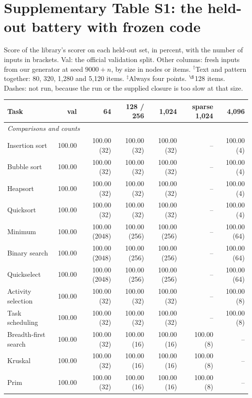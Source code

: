 \documentclass[10pt]{article}
\begin{document}
\section*{Supplementary Table S1: the held-out battery with frozen code}

{\small Score of the library's scorer on each held-out set, in percent, with the number of inputs in brackets. Val: the
official validation split. Other columns: fresh inputs from our generator at seed $9000+n$, by size in nodes or items.
$^\dagger$Text and pattern together: 80, 320, 1,280 and 5,120 items. $^\ddagger$Always four points.
$^\S$128 items. Dashes: not run, because the run or the supplied closure is too slow at that size.\par}
\begin{center}\scriptsize
\begin{tabular}{lrrrrrr}\toprule
Task & val & 64 & 128 / 256 & 1,024 & sparse 1,024 & 4,096 \\\midrule
\multicolumn{7}{l}{\textit{Comparisons and counts}} \\
Insertion sort & 100.00 & 100.00 (32) & 100.00 (32) & 100.00 (32) & -- & 100.00 (4) \\
Bubble sort & 100.00 & 100.00 (32) & 100.00 (32) & 100.00 (32) & -- & 100.00 (4) \\
Heapsort & 100.00 & 100.00 (32) & 100.00 (32) & 100.00 (32) & -- & 100.00 (4) \\
Quicksort & 100.00 & 100.00 (32) & 100.00 (32) & 100.00 (32) & -- & 100.00 (4) \\
Minimum & 100.00 & 100.00 (2048) & 100.00 (256) & 100.00 (256) & -- & 100.00 (64) \\
Binary search & 100.00 & 100.00 (2048) & 100.00 (256) & 100.00 (256) & -- & 100.00 (64) \\
Quickselect & 100.00 & 100.00 (2048) & 100.00 (256) & 100.00 (256) & -- & 100.00 (64) \\
Activity selection & 100.00 & 100.00 (32) & 100.00 (32) & 100.00 (32) & -- & 100.00 (8) \\
Task scheduling & 100.00 & 100.00 (32) & 100.00 (32) & 100.00 (32) & -- & 100.00 (8) \\
Breadth-first search & 100.00 & 100.00 (32) & 100.00 (16) & 100.00 (16) & 100.00 (8) & -- \\
Kruskal & 100.00 & 100.00 (32) & 100.00 (16) & 100.00 (16) & 100.00 (8) & -- \\
Prim & 100.00 & 100.00 (32) & 100.00 (16) & 100.00 (16) & 100.00 (8) & -- \\

\end{tabular}
\end{center}
\end{document}

